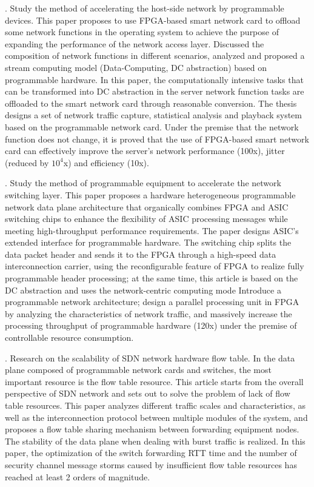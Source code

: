 . Study the method of accelerating the host-side network by programmable devices. This paper proposes to use FPGA-based smart network card to offload some network functions in the operating system to achieve the purpose of expanding the performance of the network access layer. Discussed the composition of network functions in different scenarios, analyzed and proposed a stream computing model (Data-Computing, DC abstraction) based on programmable hardware. In this paper, the computationally intensive tasks that can be transformed into DC abstraction in the server network function tasks are offloaded to the smart network card through reasonable conversion. The thesis designs a set of network traffic capture, statistical analysis and playback system based on the programmable network card. Under the premise that the network function does not change, it is proved that the use of FPGA-based smart network card can effectively improve the server's network performance (100x), jitter (reduced by $10^4$x) and efficiency (10x). \newline

. Study the method of programmable equipment to accelerate the network switching layer. This paper proposes a hardware heterogeneous programmable network data plane architecture that organically combines FPGA and ASIC switching chips to enhance the flexibility of ASIC processing messages while meeting high-throughput performance requirements. The paper designs ASIC's extended interface for programmable hardware. The switching chip splits the data packet header and sends it to the FPGA through a high-speed data interconnection carrier, using the reconfigurable feature of FPGA to realize fully programmable header processing; at the same time, this article is based on the DC abstraction and uses the network-centric computing mode Introduce a programmable network architecture; design a parallel processing unit in FPGA by analyzing the characteristics of network traffic, and massively increase the processing throughput of programmable hardware (120x) under the premise of controllable resource consumption. \newline

. Research on the scalability of SDN network hardware flow table. In the data plane composed of programmable network cards and switches, the most important resource is the flow table resource. This article starts from the overall perspective of SDN network and sets out to solve the problem of lack of flow table resources. This paper analyzes different traffic scales and characteristics, as well as the interconnection protocol between multiple modules of the system, and proposes a flow table sharing mechanism between forwarding equipment nodes. The stability of the data plane when dealing with burst traffic is realized. In this paper, the optimization of the switch forwarding RTT time and the number of security channel message storms caused by insufficient flow table resources has reached at least 2 orders of magnitude. \newline

